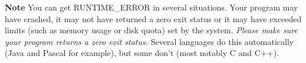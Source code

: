 \documentclass[a4paper,12pt]{article}
\newcommand{\strong}[1]{\textbf{#1}}
\begin{document}
\strong{Note} You can get RUNTIME\_ERROR in several situations. Your program
may have crashed, it may not have returned a zero exit status or it may have
exceeded limits (such as memory usage or disk quota) set by the system.
\emph{Please make sure your program returns a zero exit status.} Several
languages do this automatically (Java and Pascal for example), but some
don't (most notably C and C++).
\end{document}

